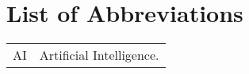 






\chapter*{List of Abbreviations}
\begin{longtable}{cp{}}


AI      &Artificial Intelligence.\\

\end{longtable}


\renewcommand{\nomGname}{\textbf{\large Mathematical Symbols}}

\renewcommand{\nomXname}{\textbf{\large Superscripts}}
\renewcommand{\nomZname}{\textbf{\large Subscripts}}


